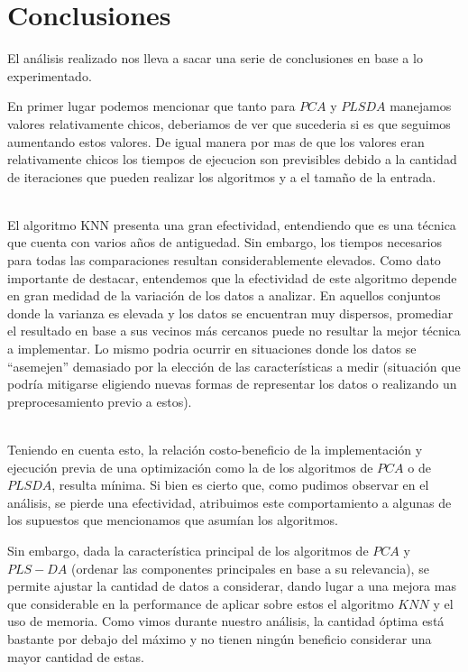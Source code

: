 \section{Conclusiones}
El análisis realizado nos lleva a sacar una serie de conclusiones en base a lo experimentado.

En primer lugar podemos mencionar que tanto para $PCA$ y $PLSDA$ manejamos valores relativamente chicos, deberiamos de ver que sucederia si es que seguimos aumentando estos valores. De igual manera por mas de que los valores eran relativamente chicos 
los tiempos de ejecucion son previsibles debido a la cantidad de iteraciones que pueden realizar los algoritmos y a el tamaño de la entrada.

\\
El algoritmo KNN presenta una gran efectividad, entendiendo que es una técnica que cuenta con varios años de antiguedad. Sin embargo, los tiempos necesarios para todas las comparaciones resultan considerablemente elevados.
Como dato importante de destacar, entendemos que la efectividad de este algoritmo depende en gran medidad de la variación de los datos a analizar. En aquellos conjuntos donde la varianza es elevada y los datos se encuentran muy dispersos, promediar el resultado en base a sus vecinos más cercanos puede no resultar la mejor técnica a implementar. Lo mismo podria ocurrir en situaciones donde los datos se ``asemejen''  demasiado por la elección de las características a medir (situación que podría mitigarse eligiendo nuevas formas de representar los datos o realizando un preprocesamiento previo a estos).

\\
Teniendo en cuenta esto, la relación costo-beneficio de la implementación y ejecución previa de una optimización como la de los algoritmos de $PCA$ o de $PLSDA$, resulta mínima. Si bien es cierto que, como pudimos observar en el análisis, se pierde una efectividad, atribuimos este comportamiento a algunas de los supuestos que mencionamos que asumían los algoritmos.

Sin embargo, dada la característica principal de los algoritmos de $PCA$ y $PLS-DA$ (ordenar las componentes principales en base a su relevancia), se permite ajustar la cantidad de datos a considerar, dando lugar a una mejora mas que considerable en la performance de aplicar sobre estos el algoritmo $KNN$ y el uso de memoria. Como vimos durante nuestro análisis, la cantidad óptima está bastante por debajo del máximo y no tienen ningún beneficio considerar una mayor cantidad de estas.

